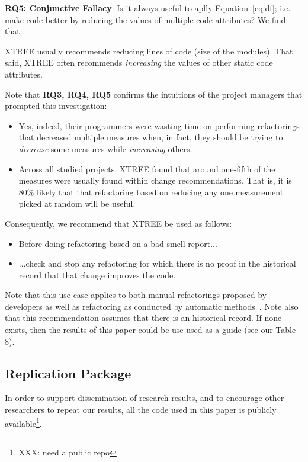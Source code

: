 \documentclass[twocolumn,5p]{elsarticle}
\newcommand{\bi}{\begin{itemize}[leftmargin=0.4cm]}
\newcommand{\ei}{\end{itemize}}
\newcommand{\eq}[1]{Equation~\ref{eq:#1}}
\theoremstyle{break}
\begin{document}
{\bf RQ5: Conjunctive Fallacy}:  
Is it always  useful  to aplly \eq{df}; i.e. make code better by   reducing the values of  multiple code attributes? We find that:
\begin{lesson}
XTREE usually recommends reducing lines of code (size of the modules).
That said,  XTREE often recommends {\em increasing} the values of other static code attributes.
\end{lesson} 
Note that {\bf RQ3, RQ4, RQ5} 
confirms the intuitions
of the project managers that prompted this investigation:
\bi
\item
Yes,  indeed, their programmers
were wasting time on   performing refactorings  that  decreased multiple measures when, in fact,
they should be trying to {\em decrease} some measures while {\em increasing} others.
\item
Across all studied projects, XTREE found that  around one-fifth  
  of the measures were usually found within  change recommendations. That is, it is 80\% likely that
  that refactoring based on reducing any one measurement picked at random will be useful.
\ei
Consequently, we  recommend that XTREE be used as follows:
\bi
\item Before doing  refactoring based on a bad smell report...
\item ...check and stop any refactoring   for which there is no proof
  in the historical record that that change improves the code.
\ei
Note that this use case applies to both manual refactorings proposed by developers
as well as refactoring as conducted by automatic methods~\cite{mkaouer2015many}.
Note also that
this recommendation assumes that there is an historical record. If none exists, then the results of this paper could be use used as a guide (see our Table 8).
 
 \subsection{Replication Package}
 
  
  In order to support dissemination
  of research results, and to encourage other researchers to repeat our results,
  all the code used in this paper is publicly available\footnote{XXX: need a public repo}.
  
\end{document}
